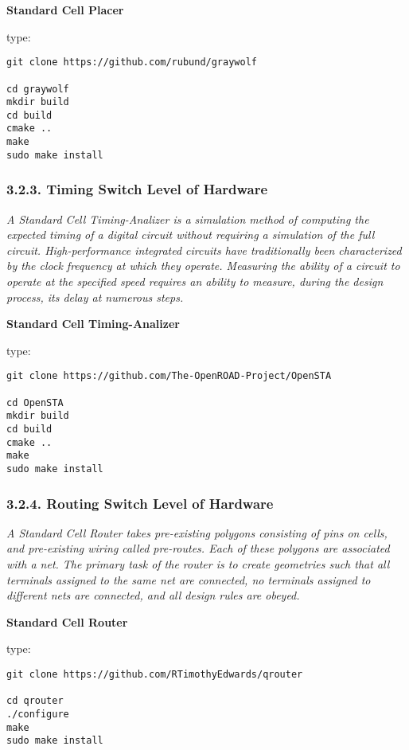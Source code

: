 \documentclass[]{article}
\begin{document}
\textbf{Standard Cell Placer}

type:

\begin{verbatim}
git clone https://github.com/rubund/graywolf

cd graywolf
mkdir build
cd build
cmake ..
make
sudo make install
\end{verbatim}

\subsubsection{3.2.3. Timing Switch Level of
Hardware}\label{timing-switch-level-of-hardware}

\emph{A Standard Cell Timing-Analizer is a simulation method of
computing the expected timing of a digital circuit without requiring a
simulation of the full circuit. High-performance integrated circuits
have traditionally been characterized by the clock frequency at which
they operate. Measuring the ability of a circuit to operate at the
specified speed requires an ability to measure, during the design
process, its delay at numerous steps.}

\textbf{Standard Cell Timing-Analizer}

type:

\begin{verbatim}
git clone https://github.com/The-OpenROAD-Project/OpenSTA

cd OpenSTA
mkdir build
cd build
cmake ..
make
sudo make install
\end{verbatim}

\subsubsection{3.2.4. Routing Switch Level of
Hardware}\label{routing-switch-level-of-hardware}

\emph{A Standard Cell Router takes pre-existing polygons consisting of
pins on cells, and pre-existing wiring called pre-routes. Each of these
polygons are associated with a net. The primary task of the router is to
create geometries such that all terminals assigned to the same net are
connected, no terminals assigned to different nets are connected, and
all design rules are obeyed.}

\textbf{Standard Cell Router}

type:

\begin{verbatim}
git clone https://github.com/RTimothyEdwards/qrouter

cd qrouter
./configure
make
sudo make install
\end{verbatim}
\end{document}
